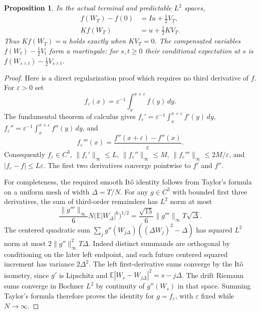 \documentclass[11pt]{article}
\newtheorem{proposition}[theorem]{Proposition}
\newcommand{\E}{\mathbb E}
\begin{document}
\begin{proposition}\label{prop:c2projection}
In the actual terminal and predictable $L^2$ spaces,
\begin{align*}
 f(W_T)-f(0)&=Iu+\tfrac12V_T,\\
 Kf(W_T)&=u+\tfrac12KV_T.
\end{align*}
Thus $Kf(W_T)=u$ holds exactly when $KV_T=0$.
The compensated variables $f(W_t)-\tfrac12V_t$ form a martingale:
for $s,t\geq0$ their conditional expectation at $s$ is
$f(W_{s\wedge t})-\tfrac12V_{s\wedge t}$.
\end{proposition}
\begin{proof}
Here is a direct regularization proof which requires no third derivative
of $f$. For $\varepsilon>0$ set
\[
 f_\varepsilon(x)=\varepsilon^{-1}\int_x^{x+\varepsilon}f(y)\,dy.
\]
The fundamental theorem of calculus gives
$f_\varepsilon'=\varepsilon^{-1}\int_x^{x+\varepsilon}f'(y)\,dy$,
$f_\varepsilon''=\varepsilon^{-1}\int_x^{x+\varepsilon}f''(y)\,dy$, and
\[
 f_\varepsilon'''(x)=
       \frac{f''(x+\varepsilon)-f''(x)}{\varepsilon}.
\]
Consequently $f_\varepsilon\in C^3$,
$\|f_\varepsilon'\|_\infty\leq L$,
$\|f_\varepsilon''\|_\infty\leq M$,
$\|f_\varepsilon'''\|_\infty\leq2M/\varepsilon$,
and $|f_\varepsilon-f|\leq L\varepsilon$.
The first two derivatives converge pointwise to $f'$ and $f''$.

For completeness, the required smooth It\^o identity follows from
Taylor's formula on a uniform mesh of width $\Delta=T/N$.
For any $g\in C^3$ with bounded first three derivatives, the sum of
third-order remainders has $L^2$ norm at most
\[
 \frac{\|g'''\|_\infty}{6}
       N\bigl(\E|W_\Delta|^6\bigr)^{1/2}
 =\frac{\sqrt{15}}6\|g'''\|_\infty T\sqrt\Delta.
\]
The centered quadratic sum
$\sum_j g''(W_{j\Delta})((\Delta W_j)^2-\Delta)$ has squared
$L^2$ norm at most $2\|g''\|_\infty^2T\Delta$.
Indeed distinct summands are orthogonal by conditioning on the later
left endpoint, and each future centered squared increment has variance
$2\Delta^2$. The left first-derivative sums converge by the It\^o
isometry, since $g'$ is Lipschitz and
$\E|W_s-W_{j\Delta}|^2=s-j\Delta$. The drift Riemann sums
converge in Bochner $L^2$ by continuity of $g''(W_s)$ in that space.
Summing Taylor's formula therefore proves the identity for
$g=f_\varepsilon$, with $\varepsilon$ fixed while $N\to\infty$.


\end{proof}
\end{document}
